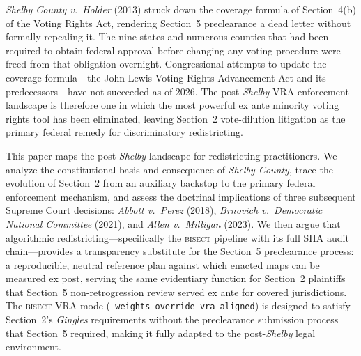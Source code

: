 \textit{Shelby County v.\ Holder} (2013) struck down the coverage formula
of Section~4(b) of the Voting Rights Act, rendering Section~5 preclearance
a dead letter without formally repealing it. The nine states and numerous
counties that had been required to obtain federal approval before changing
any voting procedure were freed from that obligation overnight.
Congressional attempts to update the coverage formula---the John Lewis
Voting Rights Advancement Act and its predecessors---have not succeeded
as of 2026. The post-\textit{Shelby} VRA enforcement landscape is therefore
one in which the most powerful ex ante minority voting rights tool has
been eliminated, leaving Section~2 vote-dilution litigation as the primary
federal remedy for discriminatory redistricting.

This paper maps the post-\textit{Shelby} landscape for redistricting
practitioners. We analyze the constitutional basis and consequence
of \textit{Shelby County}, trace the evolution of Section~2 from an
auxiliary backstop to the primary federal enforcement mechanism, and
assess the doctrinal implications of three subsequent Supreme Court
decisions: \textit{Abbott v.\ Perez} (2018), \textit{Brnovich v.\
Democratic National Committee} (2021), and \textit{Allen v.\ Milligan}
(2023). We then argue that algorithmic redistricting---specifically
the \textsc{bisect} pipeline with its full SHA audit chain---provides
a transparency substitute for the Section~5 preclearance process:
a reproducible, neutral reference plan against which enacted maps
can be measured ex post, serving the same evidentiary function for
Section~2 plaintiffs that Section~5 non-retrogression review served
ex ante for covered jurisdictions. The \textsc{bisect} VRA mode
(\texttt{--weights-override vra-aligned}) is designed to satisfy
Section~2's \textit{Gingles} requirements without the preclearance
submission process that Section~5 required, making it fully adapted
to the post-\textit{Shelby} legal environment.
